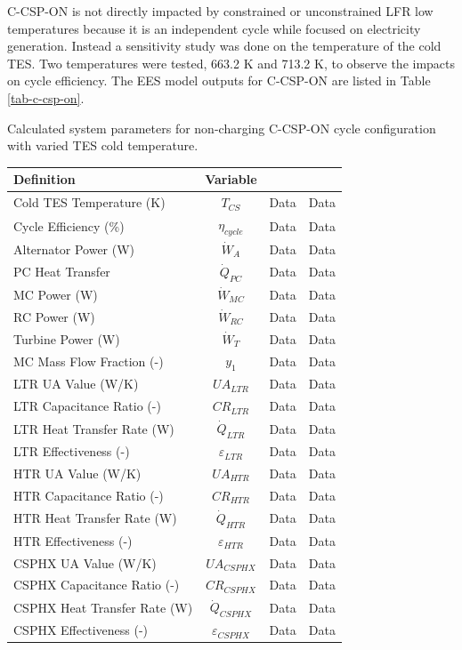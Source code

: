 \begin{paracol}{2}
\linenumbers
\switchcolumn

 C-CSP-ON is not directly impacted by constrained or unconstrained LFR low temperatures because it is an independent cycle while focused on electricity generation. Instead a sensitivity study was done on the temperature of the cold TES. Two temperatures were tested, 663.2 K and 713.2 K, to observe the impacts on cycle efficiency. The EES model outputs for C-CSP-ON are listed in Table \ref{tab-c-csp-on}.

\begin{specialtable}[H] 
    \caption{Calculated system parameters for non-charging C-CSP-ON cycle configuration with varied TES cold temperature. \label{tab-c-csp-on}}
    \begin{tabular}{lccc}
    \toprule
    \textbf{Definition} & \textbf{Variable} &  &\\
    \midrule
    Cold TES Temperature (K)	&	$T_{CS}$	&	Data	&	Data	\\
    Cycle Efficiency (\%)	&	$\eta_{cycle}$	&	Data	&	Data	\\
    Alternator Power (W)	&	$\dot{W}_{A}$	&	Data	&	Data	\\
    PC Heat Transfer	&	$\dot{Q}_{PC}$	&	Data	&	Data	\\
    MC Power (W)	&	$\dot{W}_{MC}$	&	Data	&	Data	\\
    RC Power (W)	&	$\dot{W}_{RC}$	&	Data	&	Data	\\
    Turbine Power (W)	&	$\dot{W}_{T}$	&	Data	&	Data	\\
    MC Mass Flow Fraction (-)	&	$y_{1}$	&	Data	&	Data	\\
    LTR UA Value (W/K)	&	$UA_{LTR}$	&	Data	&	Data	\\
    LTR Capacitance Ratio (-)	&	$CR_{LTR}$	&	Data	&	Data	\\
    LTR Heat Transfer Rate (W)	&	$\dot{Q}_{LTR}$	&	Data	&	Data	\\
    LTR Effectiveness (-)	&	$\varepsilon_{LTR}$	&	Data	&	Data	\\
    HTR UA Value (W/K)	&	$UA_{HTR}$	&	Data	&	Data	\\
    HTR Capacitance Ratio (-)	&	$CR_{HTR}$	&	Data	&	Data	\\
    HTR Heat Transfer Rate (W)	&	$\dot{Q}_{HTR}$	&	Data	&	Data	\\
    HTR Effectiveness (-)	&	$\varepsilon_{HTR}$	&	Data	&	Data	\\
    CSPHX UA Value (W/K)	&	$UA_{CSPHX}$	&	Data	&	Data	\\
    CSPHX Capacitance Ratio (-)	&	$CR_{CSPHX}$	&	Data	&	Data	\\
    CSPHX Heat Transfer Rate (W)	&	$\dot{Q}_{CSPHX}$	&	Data	&	Data	\\
    CSPHX Effectiveness (-)	&	$\varepsilon_{CSPHX}$	&	Data	&	Data	\\
    \bottomrule
    \end{tabular}\\
\end{specialtable}


\end{paracol}
